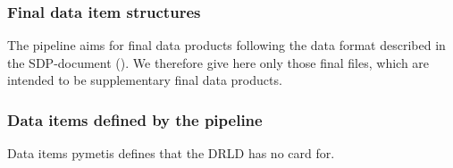 

\clearpage
\subsubsection{Final data item structures}\label{sssec:lssfinaldatastructs}
The pipeline aims for final data products following the data format described in the \ac{SDP}-document (\cite{ESO-products_standard}). We therefore give here only those final files, which are intended to be supplementary final data products.














\subsubsection{Data items defined by the pipeline}
Data items pymetis defines that the DRLD has no card for.


